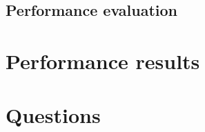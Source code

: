 \documentclass{article}
\begin{document}
\subsection{Performance evaluation}


\section{Performance results}


\section{Questions}

%
%
%
%
\end{document}
